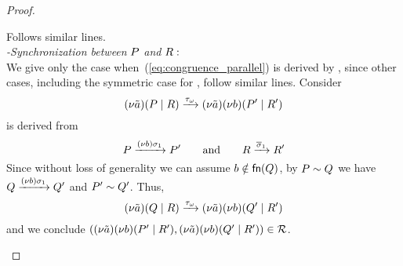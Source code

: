 \begin{proof}
\begin{itemize}
\begin{enumerate}
Follows similar lines.
\\
\emph{-Synchronization between} $P$ \emph{and} $R:$ 
\\
We give only the case when~(\ref{eq:congruence_parallel}) is derived by , since other cases, including the symmetric case for , follow similar lines. Consider
\[
(\nu \tilde{a})(P\;|\;R)\xrightarrow{\tau_\omega}(\nu \tilde{a})(\nu b)(P'\;|\;R')
\] 
is derived from 
\[
P\xrightarrow{(\nu b)\sigma_1}P'
\qquad \mbox{and} \qquad
R\xrightarrow{\overline{\sigma}_1}R'
\]
Since without loss of generality we can assume $b\notin\mathsf{fn}(Q)$, by $P\sim Q$ we have $Q\xrightarrow{(\nu b)\sigma_1}Q'$ and $P'\sim Q'$. Thus, 
\[
(\nu \tilde{a})(Q\;|\;R)\xrightarrow{\tau_\omega}(\nu \tilde{a})(\nu b)(Q'\;|\;R')
\] 
and we conclude $((\nu \tilde{a})(\nu b)(P'\;|\;R'), (\nu \tilde{a})(\nu b)(Q'\;|\;R'))\in {\cal R}$.


\end{enumerate}
\end{itemize}
\end{proof}
